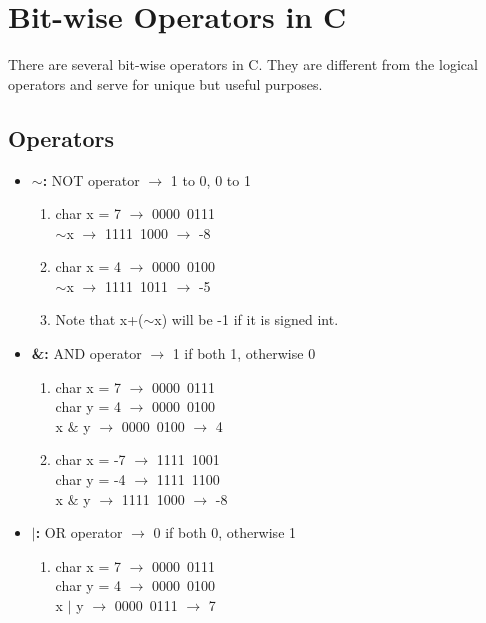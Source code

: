 \documentclass{article}
\begin{document}
\newpage


\section{Bit-wise Operators in C}
There are several bit-wise operators in C. They are different from the logical operators and serve for unique but useful purposes.
\subsection{Operators}
\begin{itemize}
    \item \textbf{$\sim$: }NOT operator $\rightarrow$ 1 to 0, 0 to 1
        \begin{enumerate}
            \item char x = 7 $\rightarrow$ 0000~0111\\
            $\sim$x $\rightarrow$ 1111~1000 $\rightarrow$ -8
            \item char x = 4 $\rightarrow$ 0000~0100\\
            $\sim$x $\rightarrow$ 1111~1011 $\rightarrow$ -5
            \item Note that x+($\sim$x) will be -1 if it is signed int.
        \end{enumerate}
    \item \textbf{\&: }AND operator $\rightarrow$ 1 if both 1, otherwise 0
        \begin{enumerate}
            \item char x = 7 $\rightarrow$ 0000~0111\\
            char y = 4 $\rightarrow$ 0000~0100\\
            x $\&$ y $\rightarrow$ 0000~0100 $\rightarrow$ 4
            \item char x = -7 $\rightarrow$ 1111~1001\\
            char y = -4 $\rightarrow$ 1111~1100\\
            x $\&$ y $\rightarrow$ 1111~1000 $\rightarrow$ -8
        \end{enumerate}
    \item \textbf{$\mid$: }OR operator $\rightarrow$ 0 if both 0, otherwise 1
        \begin{enumerate}
            \item char x = 7 $\rightarrow$ 0000~0111\\
            char y = 4 $\rightarrow$ 0000~0100\\
            x $\mid$ y $\rightarrow$ 0000~0111 $\rightarrow$ 7

\end{enumerate}
\end{itemize}
\end{document}
